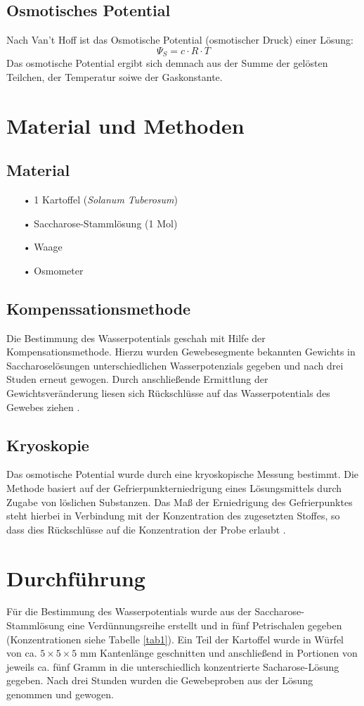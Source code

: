 \documentclass[11pt,a4paper,DIV=10,]{scrartcl}
\begin{document}
\subsection*{Osmotisches Potential}
Nach Van't Hoff ist das Osmotische Potential (osmotischer Druck) einer Lösung:
\begin{equation}
\Psi_S=c\cdot R\cdot T \label{hoff}
\end{equation}
Das osmotische Potential  ergibt sich demnach aus der Summe der gelösten Teilchen, der Temperatur soiwe der Gaskonstante. 
%
\section*{Material und Methoden}
\subsection*{Material}
\begin{enumerate}
	\item[•] 1 Kartoffel (\textit{Solanum Tuberosum})
	\item[•] Saccharose-Stammlösung (1 Mol)
	\item[•] Waage
	\item[•] Osmometer
\end{enumerate}
\subsection*{Kompenssationsmethode}
Die Bestimmung des Wasserpotentials geschah mit Hilfe der Kompensationsmethode. Hier\-zu  wurden Gewebesegmente bekannten Gewichts in Saccharoselösungen unter\-schied\-lichen Wasserpotenzials gegeben und nach drei Studen erneut gewogen. Durch an\-schließ\-en\-de Ermittlung der Gewichtsveränderung liesen sich Rückschlüsse auf das Wasserpotentials des Gewebes ziehen \citep[vgl.][S. 261]{strasburger_lehrbuch_2012}.
\subsection*{Kryoskopie}
Das osmotische Potential wurde durch eine kryoskopische Messung bestimmt. Die Metho\-de basiert auf der  Gefrierpunkterniedrigung eines Lösungsmittels durch Zugabe von löslichen Substanzen. Das Maß der Erniedrigung des Gefrierpunktes steht hierbei in Verbindung mit der Konzentration des zugesetzten Stoffes, so dass dies Rückschlüsse auf die Konzentration der Probe erlaubt \citep[vgl.][S. 261]{strasburger_lehrbuch_2012}.
%
\section*{Durchführung}
Für die Bestimmung des Wasserpotentials wurde aus der Saccharose-Stammlösung eine Verdünnungsreihe erstellt und in fünf Petrischalen gegeben (Konzentrationen siehe Tabelle \ref{tab1}). Ein Teil der Kartoffel wurde in Würfel von ca. $5\times5\times5$ mm Kantenlänge geschnitten und anschließend in Portionen von jeweils ca. fünf Gramm in die unterschiedlich konzentrierte Sacharose-Lösung gegeben. Nach drei Stunden wurden die Gewebeproben aus der Lösung genommen und gewogen.
\end{document}

